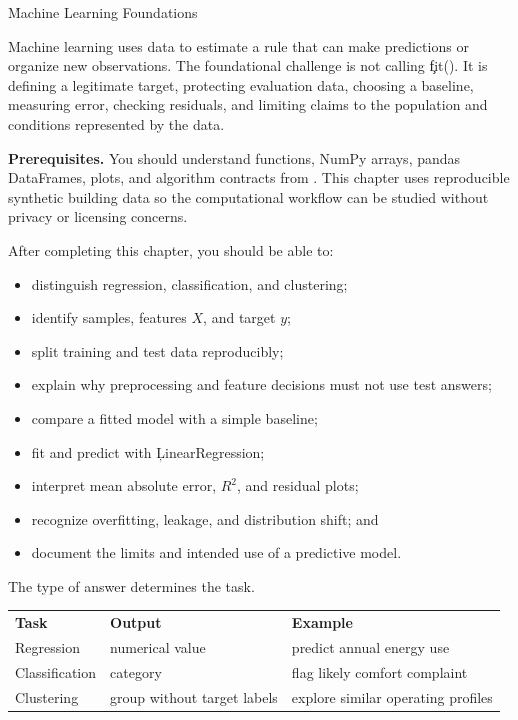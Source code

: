 
\h{Machine Learning Foundations}
\label{ch:19}

Machine learning uses data to estimate a rule that can make predictions or
organize new observations. The foundational challenge is not calling
\c{fit()}. It is defining a legitimate target, protecting evaluation data,
choosing a baseline, measuring error, checking residuals, and limiting claims
to the population and conditions represented by the data.

\begin{NoteBox}
\textbf{Prerequisites.} You should understand functions, NumPy arrays, pandas
DataFrames, plots, and algorithm contracts from .
This chapter uses reproducible
synthetic building data so the computational workflow can be studied without
privacy or licensing concerns.
\end{NoteBox}

\begin{tcolorbox}[title=Learning outcomes,colframe=orange,colback=white,arc=2mm]
After completing this chapter, you should be able to:
\begin{itemize}
    \item distinguish regression, classification, and clustering;
    \item identify samples, features $X$, and target $y$;
    \item split training and test data reproducibly;
    \item explain why preprocessing and feature decisions must not use test answers;
    \item compare a fitted model with a simple baseline;
    \item fit and predict with \c{LinearRegression};
    \item interpret mean absolute error, $R^2$, and residual plots;
    \item recognize overfitting, leakage, and distribution shift; and
    \item document the limits and intended use of a predictive model.
\end{itemize}
\end{tcolorbox}


The type of answer determines the task.

\begin{center}
\begin{tabular}{lll}
\textbf{Task} & \textbf{Output} & \textbf{Example} \\
Regression & numerical value & predict annual energy use \\
Classification & category & flag likely comfort complaint \\
Clustering & group without target labels & explore similar operating profiles \\
\end{tabular}
\end{center}

